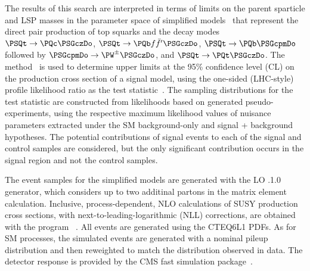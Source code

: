 The results of this search are interpreted in terms of limits on the
parent sparticle and LSP masses in the parameter space of simplified
models~\cite{Alwall:2008ag, Alwall:2008va, sms} that represent the
direct pair production of top squarks and the decay modes $\PSQt
\to\PQc\PSGczDo$, $\PSQt \to{\PQb \ffbp} \PSGczDo$, $\PSQt \to \PQb
\PSGcpmDo$ followed by $\PSGcpmDo \to \PW^\pm \PSGczDo$, and $\PSQt
\to \PQt \PSGczDo$. The \cls method~\cite{read,junk} is used to
determine upper limits at the 95\% confidence level (CL) on the
production cross section of a signal model, using the one-sided
(LHC-style) profile likelihood ratio as the test
statistic~\cite{higgs-comb}. The sampling distributions for the test
statistic are constructed from likelihoods based on generated
pseudo-experiments, using the respective maximum likelihood values of
nuisance parameters extracted under the SM background-only and signal
+ background hypotheses. The potential contributions of signal events
to each of the signal and control samples are considered, but the only
significant contribution occurs in the signal region and not the
control samples.

The event samples for the simplified models are generated with the LO
.1.0 generator, which considers up to two additinal
partons in the matrix element calculation. Inclusive,
process-dependent, NLO calculations of SUSY production cross sections,
with next-to-leading-logarithmic (NLL) corrections, are obtained with
the program ~\cite{Beenakker:1996ch, PhysRevD.80.095004,
  PhysRevLett.102.111802, PhysRevD.80.095004, 1126-6708-2009-12-041,
  doi:10.1142/S0217751X11053560, susy-nlo-nll}. All events are
generated using the \textsc{CTEQ6L1} PDFs. As for SM processes, the
simulated events are generated with a nominal pileup distribution and
then reweighted to match the distribution observed in data. The
detector response is provided by the CMS fast simulation
package~\cite{fastsim}.

